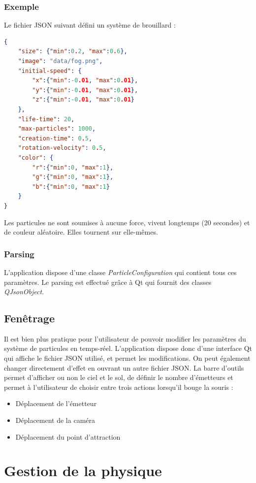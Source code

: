 \documentclass[a4paper,10pt]{article}
\begin{document}
\subsubsection{Exemple}
Le fichier JSON suivant défini un système de brouillard :
\begin{lstlisting}[language=json,firstnumber=1]
{
    "size": {"min":0.2, "max":0.6},
    "image": "data/fog.png",
    "initial-speed": {
        "x":{"min":-0.01, "max":0.01},
        "y":{"min":-0.01, "max":0.01},
        "z":{"min":-0.01, "max":0.01}
    },
    "life-time": 20,
    "max-particles": 1000,
    "creation-time": 0.5,
    "rotation-velocity": 0.5,
    "color": {
        "r":{"min":0, "max":1},
        "g":{"min":0, "max":1},
        "b":{"min":0, "max":1}
    }
}
\end{lstlisting}
Les particules ne sont soumises à aucune force, vivent longtemps (20 secondes) et de couleur aléatoire.
Elles tournent sur elle-mêmes.


\subsubsection{Parsing}
L'application dispose d'une classe \emph{ParticleConfiguration} qui contient tous ces paramètres.
Le parsing est effectué grâce à Qt qui fournit des classes \emph{QJsonObject}.

\subsection{Fenêtrage}
Il est bien plus pratique pour l'utilisateur de pouvoir modifier les paramètres du système de particules en temps-réel.
L'application dispose donc d'une interface Qt qui affiche le fichier JSON utilisé, et permet les modifications.
On peut également changer directement d'effet en ouvrant un autre fichier JSON.
La barre d'outils permet d'afficher ou non le ciel et le sol, de définir le nombre d'émetteurs et permet à l'utilisateur de choisir entre trois actions lorsqu'il bouge la souris :
\begin{itemize}
 \item Déplacement de l'émetteur
 \item Déplacement de la caméra
 \item Déplacement du point d'attraction
\end{itemize}


\section{Gestion de la physique}
\end{document}
